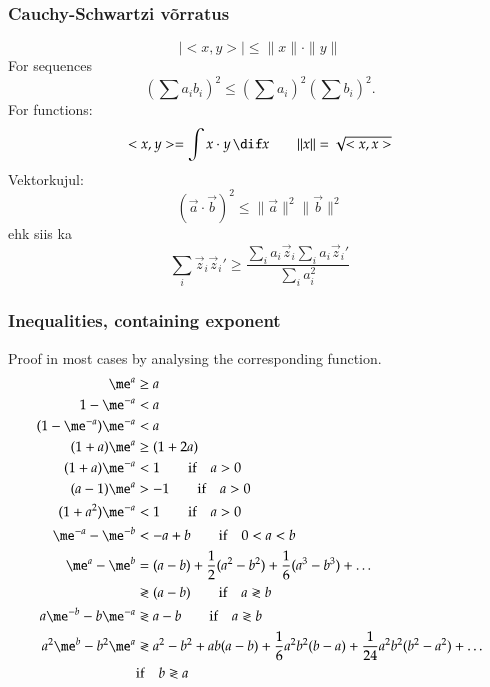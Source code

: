 \documentclass[a4paper]{article}
\numberwithin{equation}{subsection}
\begin{document}
\subsubsection{Cauchy-Schwartzi võrratus}
\begin{equation}
  |<x,y>| \le \|x\| \cdot \|y\|
\end{equation}
For sequences
\begin{equation}
\left( \sum a_i b_i \right)^2 \le
  \left( \sum a_i \right)^2 \left( \sum b_i \right)^2.
\end{equation}
For functions:
\begin{equation*}
  <x,y> = \int x \cdot y \, \dif x
  \qquad
  \| x \| = \sqrt{<x,x>}
\end{equation*}
Vektorkujul:
\begin{equation}
(\vec a \cdot \vec b)^2 \le \|\vec a\|^2 \|\vec b\|^2
\end{equation}
ehk siis ka
\begin{equation}
\sum_i \vec z_i \vec z_i' \ge
  \frac{\sum_i a_i \vec z_i \sum_i a_i \vec z_i'}{\sum_i a_i^2}
\end{equation}


\subsubsection{Inequalities, containing exponent}
Proof in most cases by analysing the corresponding function.
\begin{align}
  \me^a &\ge a\\
  1 - \me^{-a} &< a\\
  (1 - \me^{-a}) \me^{-a} &< a\\
  (1 + a) \me^a & \ge (1 + 2a)\\
  (1 + a) \me^{-a} &< 1
  \qquad \text{if} \quad a > 0\\
  (a - 1) \me^a &> -1
  \qquad \text{if} \quad a > 0\\
  (1 + a^2) \me^{-a} &< 1
  \qquad \text{if} \quad a > 0\\
  \me^{-a} - \me^{-b} &< -a + b 
  \qquad \text{if} \quad 0 < a < b\\
  \me^a - \me^b 
  &= 
  (a-b) + \frac{1}{2}(a^2 - b^2) + \frac{1}{6}(a^3 - b^3) + \dots\\*
  &\gtrless (a - b)
  \qquad \text{if} \quad a \gtrless b\\
  a \me^{-b} - b\me^{-a}
  & \gtrless
  a - b
  \qquad \text{if} \quad a \gtrless b\\
  a^2 \me^{b} - b^2 \me^{a}
  & \gtrless
  a^2 - b^2 +
  ab(a - b) +
  \frac{1}{6}a^2 b^2 (b - a) +
  \frac{1}{24}a^2 b^2 (b^2 - a^2) + \dots
  \notag\\*
  & \text{if} \quad b \gtrless a
\end{align}
\end{document}
